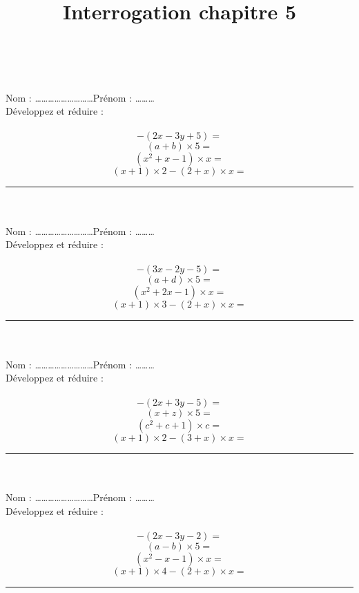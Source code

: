 \documentclass[14 pt]{extarticle}
\title{Interrogation chapitre 5}
\date{}
\theoremstyle{plain}
\begin{document}
 \ \\ \ \\
 Nom : \ldots\ldots\ldots\ldots\ldots\ldots\ldots\ldots\ldots Prénom : \ldots\ldots\ldots \\ 
Développez et réduire :\\ \ \\ 
 \[ - (2x - 3y +5) =   \] 
 \[ (a + b) \times 5 = \] 
 \[ (x^2 + x - 1) \times x = \]
 \[ (x+1)\times 2 - (2 + x) \times x = \]
 
 \hrule
 \ \\ \ \\
 Nom : \ldots\ldots\ldots\ldots\ldots\ldots\ldots\ldots\ldots Prénom : \ldots\ldots\ldots \\ 
Développez et réduire :\\ \ \\ 
 \[ - (3x - 2y - 5) =   \] 
 \[ (a + d) \times 5 = \] 
 \[ (x^2 + 2x - 1) \times x = \]
 \[ (x+1)\times 3 - (2 + x) \times x = \]
 
 \hrule
 \ \\ \ \\
 Nom : \ldots\ldots\ldots\ldots\ldots\ldots\ldots\ldots\ldots Prénom : \ldots\ldots\ldots \\ 
Développez et réduire :\\ \ \\ 
 \[ - (2x + 3y -5) =   \] 
 \[ (x + z) \times 5 = \] 
 \[ (c^2 + c + 1) \times c = \]
 \[ (x+1)\times 2 - (3 + x) \times x = \]
 
 \hrule
 \ \\ \ \\
 Nom : \ldots\ldots\ldots\ldots\ldots\ldots\ldots\ldots\ldots Prénom : \ldots\ldots\ldots \\ 
Développez et réduire :\\ \ \\ 
 \[ - (2x - 3y -2) =   \] 
 \[ (a - b) \times 5 = \] 
 \[ (x^2 - x - 1) \times x = \]
 \[ (x+1)\times 4 - (2 + x) \times x = \]
 
 \hrule
 
 
 
 	
\end{document}
